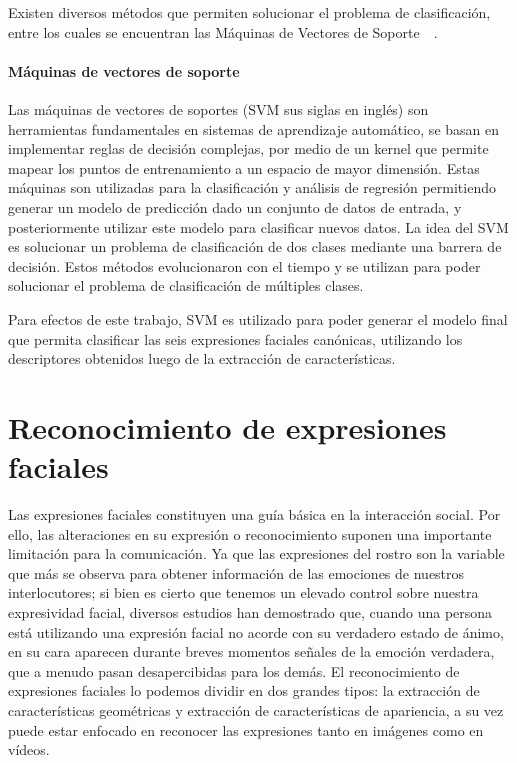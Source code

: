 Existen diversos métodos que permiten solucionar el problema de clasificación, entre los cuales se encuentran las Máquinas de Vectores de Soporte~\cite{Cortes1995}~\cite{Hearst1998}.

	\paragraph{Máquinas de vectores de soporte}
	\label{sec:svm}
	Las máquinas de vectores de soportes (SVM sus siglas en inglés) son herramientas fundamentales en sistemas de aprendizaje automático, se basan en  implementar reglas de decisión complejas, por medio de un kernel que permite mapear los puntos de entrenamiento a un espacio de mayor dimensión. Estas máquinas son utilizadas para la clasificación y análisis de regresión permitiendo generar un modelo de predicción dado un conjunto de datos de entrada, y posteriormente utilizar este modelo para clasificar nuevos datos.
La idea del SVM es solucionar un problema de clasificación de dos clases mediante una barrera de decisión. Estos métodos evolucionaron con el tiempo y se utilizan para poder solucionar el problema de clasificación de múltiples clases.

Para efectos de este trabajo, SVM es utilizado para poder generar el modelo final que permita clasificar las seis expresiones faciales canónicas, utilizando los descriptores obtenidos luego de la extracción de características.

\section{Reconocimiento de expresiones faciales}
\label{sec:fer}
Las expresiones faciales constituyen una guía básica en la interacción social. Por ello, las alteraciones en su expresión o reconocimiento suponen una importante limitación para la comunicación. Ya que las expresiones del rostro son la variable que más se observa para obtener información de las emociones de nuestros interlocutores; si bien es cierto que tenemos un elevado control sobre nuestra expresividad facial, diversos estudios han demostrado que, cuando una persona está utilizando una expresión facial no acorde con su verdadero estado de ánimo, en su cara aparecen durante breves momentos señales de la emoción verdadera, que a menudo pasan desapercibidas para los demás.
El reconocimiento de expresiones faciales lo podemos dividir en dos grandes tipos: la extracción de características geométricas y extracción de características de apariencia, a su vez puede estar enfocado en reconocer las expresiones tanto en imágenes como en vídeos.  


